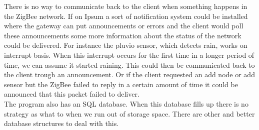 There is no way to communicate back to the client when something happens in the ZigBee network. If on Ipsum a sort of notification system could be installed where the gateway can put announcements or errors and the client would poll these announcements some more information about the status of the network could be delivered. For instance the pluvio sensor, which detects rain, works on interrupt basis. When this interrupt occurs for the first time in a longer period of time, we can assume it started raining. This could then be communicated back to the client trough an announcement. Or if the client requested an add node or add sensor but the ZigBee failed to reply in a certain amount of time it could be announced that this packet failed to deliver.\\
The program also has an SQL database. When this database fills up there is no strategy as what to when we run out of storage space. There are other and better database structures to deal with this.
 
